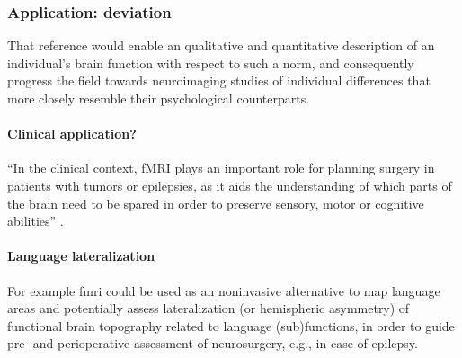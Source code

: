 \subsubsection{Application: deviation}



%
That reference would enable an qualitative and quantitative description of an
individual's brain function with respect to such a norm, and consequently
progress the field towards neuroimaging studies of individual differences that
more closely resemble their psychological counterparts.


\paragraph{Clinical application?}




``In the clinical context, fMRI plays an important role for planning surgery in
patients with tumors or epilepsies, as it aids the understanding of which parts
of the brain need to be spared in order to preserve sensory, motor or cognitive
abilities'' \citep{wegrzyn2018thought}.


\paragraph{Language lateralization}


%
For example \ac{fmri} could be used as an noninvasive alternative to map
language areas and potentially assess lateralization (or hemispheric asymmetry)
of functional brain topography related to language (sub)functions, in order to
guide pre- and perioperative assessment of neurosurgery, e.g., in case of
epilepsy.



